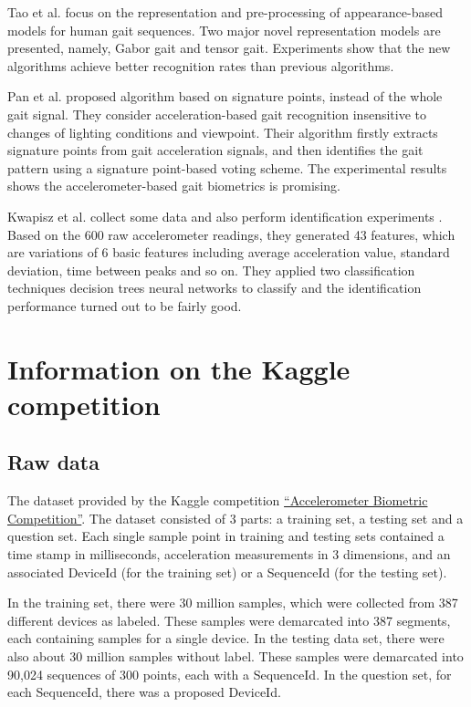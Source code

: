 \documentclass{article} %
\begin{document}
Tao et al.\cite{Tao:ToPAMI2007} focus on the representation and pre-processing of appearance-based models for human gait sequences. Two major novel representation models are presented, namely, Gabor gait and tensor gait. Experiments show that the new algorithms achieve better recognition rates than previous algorithms.

Pan et al. \cite{Pan:EL2009} proposed algorithm based on signature points, instead of the whole gait signal. They consider acceleration-based gait recognition insensitive to changes of lighting conditions and viewpoint. Their algorithm firstly extracts signature points from gait acceleration signals, and then identifies the gait pattern using a signature point-based voting scheme. The experimental results shows the accelerometer-based gait biometrics is promising. 

Kwapisz et al.\cite{Kwapisz:BTAS2009} collect some data and also perform identification experiments . Based on the 600 raw accelerometer readings, they generated 43 features, which are variations of 6 basic features including average acceleration value, standard deviation, time between peaks and so on. They applied two classification techniques decision trees neural networks to classify and the identification performance turned out to be fairly good.


\section{Information on the Kaggle competition}
\subsection{Raw data}
The dataset provided by the Kaggle competition \href{http://www.kaggle.com/c/accelerometer-biometric-competition}{``Accelerometer Biometric Competition''}. The dataset consisted of 3 parts: a training set, a testing set and a question set. Each single sample point in training and testing sets contained a time stamp in milliseconds, acceleration measurements in 3 dimensions, and an associated DeviceId (for the training set) or a SequenceId (for the testing set). 

In the training set, there were 30 million samples, which were collected from 387 different devices as labeled. These samples were demarcated into 387 segments, each containing samples for a single device. In the testing data set, there were also about 30 million samples without label. These samples were demarcated into 90,024 sequences of 300 points, each with a SequenceId. In the question set, for each SequenceId, there was a proposed DeviceId.
\end{document}
